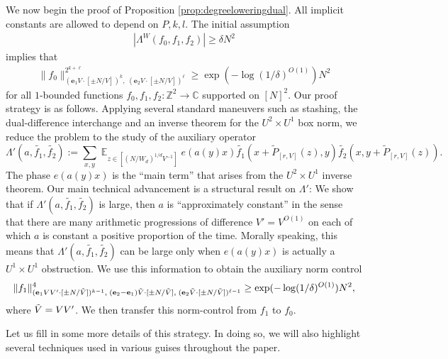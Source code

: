 \documentclass[11pt]{amsart}
\theoremstyle{definition}
\DeclareMathOperator*{\E}{\mathbb{E}}
\newcommand{\C}{{\mathbb C}}
\newcommand{\Z}{{\mathbb Z}}
\newcommand{\be}{{\mathbf{e}}}
\begin{document}
We now begin the proof of Proposition \ref{prop:degreeloweringdual}. All implicit constants are allowed to depend on $P,k,l$. 
The initial assumption
\begin{align*}%
    |\Lambda^W(f_0, f_1, f_2)| \ge \delta N^2
\end{align*}
implies that
\begin{align}\label{E: initial f_0 control}
    \|f_0\|_{(\be_1V \cdot [\pm N/V])^k,\; (\be_2 V \cdot [\pm N/V])^\ell}^{2^{k+\ell}} \geq \exp(-\log(1/\delta)^{O(1)}) N^2
\end{align}
for all $1$-bounded functions $f_0, f_1, f_2:\Z^2\to\C$ supported on $[N]^2$. Our proof strategy is as follows. Applying several standard maneuvers such as stashing, the dual-difference interchange and an inverse theorem for the $U^2\times U^1$ box norm, we reduce the problem to the study of the auxiliary operator
$$\Lambda'(a,\widetilde{f_1},\widetilde{f_2}):=\sum_{x,y} \E_{z \in [(N/W_d)^{1/d}V^{-1}]} e(a(y)x) \widetilde{f_1}(x+\widetilde P_{[r, V]}(z),y) \widetilde{f_2}(x,y+\widetilde P_{[r, V]}(z)).$$
The phase $e(a(y)x)$ is the ``main term'' that arises from the $U^2\times U^1$ inverse theorem.
Our main technical advancement is a structural result on $\Lambda'$: We show that if $\Lambda'(a,\widetilde{f_1},\widetilde{f_2})$ is large, then $a$ is ``approximately constant'' in the sense that there are many arithmetic progressions of difference $V'=V^{O(1)}$ on each of which $a$ is constant a positive proportion of the time. Morally speaking, this means that $\Lambda'(a,\widetilde{f_1},\widetilde{f_2})$ can be large only when $e(a(y)x)$ is actually a $U^1\times U^1$ obstruction. We use this information to obtain the auxiliary norm control
\begin{align*}
    \|f_1\|^4_{(\be_1 VV' \cdot [\pm N/\Tilde{V}])^{k - 1},\; (\be_2 - \be_1)\Tilde{V} \cdot [\pm N/\Tilde{V}],\; (\be_2 \Tilde{V} \cdot [\pm N/\Tilde{V}])^{\ell-1}} \geq \exp(-\log(1/\delta)^{O(1)}) N^2,
\end{align*}
where $\Tilde{V}=VV'$.  We then transfer this norm-control from $f_1$ to $f_0$.


Let us fill in some more details of this strategy. In doing so, we will also highlight several techniques used in various guises throughout the paper. 
\end{document}
